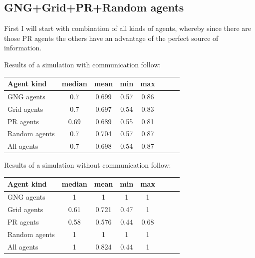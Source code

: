 \subsection{GNG+Grid+PR+Random agents}

First I will start with combination of all kinds of agents, whereby since there are those PR agents the others have an advantage of the perfect source of information.  

Results of a simulation with communication follow:
         
\begin{center}   
  \begin{tabular}{l*{6}{c}r}
  Agent kind        & median & mean & min & max \\
  \hline
  GNG agents        & 0.7 & 0.699 & 0.57 & 0.86  \\
  Grid agents       & 0.7 & 0.697 & 0.54 & 0.83  \\   
  PR agents         & 0.69 & 0.689 & 0.55 & 0.81 \\  
  Random agents     & 0.7 & 0.704 & 0.57 & 0.87  \\
  All agents        & 0.7 & 0.698 & 0.54 & 0.87  \\ 
  \end{tabular}                  
\end{center}
       
Results of a simulation without communication follow:
              
\begin{center}
  \begin{tabular}{l*{6}{c}r}
  Agent kind        & median & mean & min & max \\
  \hline
  GNG agents        & 1 & 1 & 1 & 1  \\
  Grid agents       & 0.61 & 0.721 & 0.47 & 1  \\   
  PR agents         & 0.58 & 0.576 & 0.44 & 0.68 \\  
  Random agents     & 1 & 1 & 1 & 1  \\
  All agents        & 1 & 0.824 & 0.44 & 1  \\ 
  \end{tabular}                    
\end{center} 


